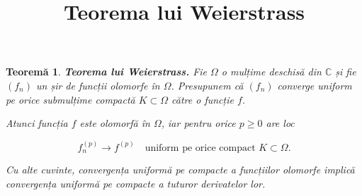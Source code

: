 \documentclass[12pt]{article}
\title{Teorema lui Weierstrass}
\author{}
\date{}
\theoremstyle{plain}
\newtheorem{theorem}{Teoremă}
\begin{document}
\maketitle

\begin{theorem}
\textbf{Teorema lui Weierstrass.}  
Fie $\Omega$ o mulțime deschisă din $\mathbb{C}$ și fie $(f_n)$ un șir de funcții olomorfe în $\Omega$.  
Presupunem că $(f_n)$ converge uniform pe orice submulțime compactă $K \subset \Omega$ către o funcție $f$.

Atunci funcția $f$ este olomorfă în $\Omega$, iar pentru orice $p \ge 0$ are loc



\[
f_n^{(p)} \to f^{(p)} \quad \text{uniform pe orice compact } K \subset \Omega.
\]



Cu alte cuvinte, convergența uniformă pe compacte a funcțiilor olomorfe implică convergența uniformă pe compacte a tuturor derivatelor lor.
\end{theorem}
\end{document}
